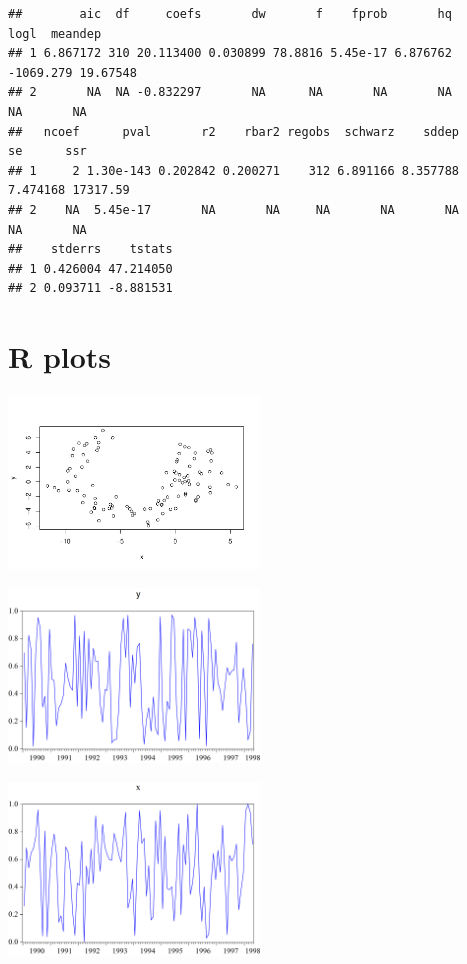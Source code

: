 \documentclass[
]{article}
\begin{document}
\begin{verbatim}
##        aic  df     coefs       dw       f    fprob       hq      logl  meandep
## 1 6.867172 310 20.113400 0.030899 78.8816 5.45e-17 6.876762 -1069.279 19.67548
## 2       NA  NA -0.832297       NA      NA       NA       NA        NA       NA
##   ncoef      pval       r2    rbar2 regobs  schwarz    sddep       se      ssr
## 1     2 1.30e-143 0.202842 0.200271    312 6.891166 8.357788 7.474168 17317.59
## 2    NA  5.45e-17       NA       NA     NA       NA       NA       NA       NA
##    stderrs    tstats
## 1 0.426004 47.214050
## 2 0.093711 -8.881531
\end{verbatim}

\hypertarget{r-plots}{%
\section{R plots}\label{r-plots}}

\begin{center}\includegraphics[width=0.5\textwidth]{test_engEviews_files/figure-latex/label-1} \end{center}

\begin{center}\includegraphics[width=0.5\textwidth]{EViewsR_files/eview-graph-y} \end{center}

\begin{center}\includegraphics[width=0.5\textwidth]{EViewsR_files/eview-graph-x} \end{center}
\end{document}
